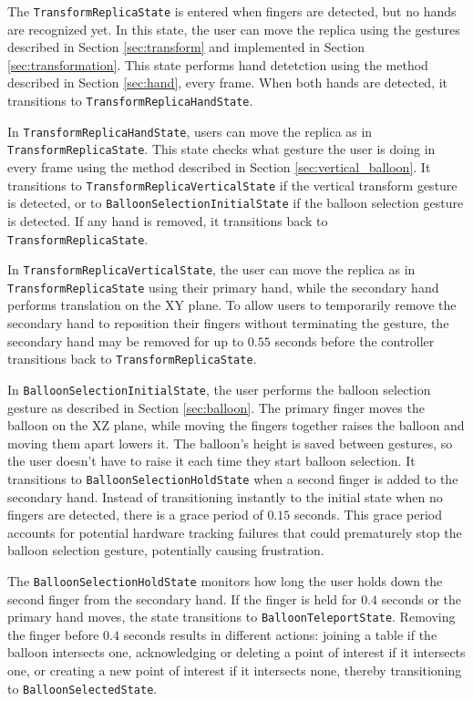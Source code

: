     The \lstinline{TransformReplicaState} is entered when fingers are detected, but no hands are recognized yet. In this state, the user can move the replica using the gestures described in Section \ref{sec:transform} and implemented in Section \ref{sec:transformation}. This state performs hand detetction using the method described in Section \ref{sec:hand}, every frame. When both hands are detected, it transitions to \lstinline{TransformReplicaHandState}.
    
    In \lstinline{TransformReplicaHandState}, users can move the replica as in \lstinline{TransformReplicaState}. This state checks what gesture the user is doing in every frame using the method described in Section \ref{sec:vertical_balloon}. It transitions to \lstinline{TransformReplicaVerticalState} if the vertical transform gesture is detected, or to \lstinline{BalloonSelectionInitialState} if the balloon selection gesture is detected. If any hand is removed, it transitions back to \lstinline{TransformReplicaState}.

    In \lstinline{TransformReplicaVerticalState}, the user can move the replica as in \lstinline{TransformReplicaState} using their primary hand, while the secondary hand performs translation on the XY plane. To allow users to temporarily remove the secondary hand to reposition their fingers without terminating the gesture, the secondary hand may be removed for up to $0.55$ seconds before the controller transitions back to \lstinline{TransformReplicaState}.

    In \lstinline{BalloonSelectionInitialState}, the user performs the balloon selection gesture as described in Section \ref{sec:balloon}. The primary finger moves the balloon on the XZ plane, while moving the fingers together raises the balloon and moving them apart lowers it. The balloon's height is saved between gestures, so the user doesn't have to raise it each time they start balloon selection. It transitions to \lstinline{BalloonSelectionHoldState} when a second finger is added to the secondary hand. Instead of transitioning instantly to the initial state when no fingers are detected, there is a grace period of $0.15$ seconds. This grace period accounts for potential hardware tracking failures that could prematurely stop the balloon selection gesture, potentially causing frustration.

    The \lstinline{BalloonSelectionHoldState} monitors how long the user holds down the second finger from the secondary hand. If the finger is held for $0.4$ seconds or the primary hand moves, the state transitions to \lstinline{BalloonTeleportState}. Removing the finger before $0.4$ seconds results in different actions: joining a table if the balloon intersects one, acknowledging or deleting a point of interest if it intersects one, or creating a new point of interest if it intersects none, thereby transitioning to \lstinline{BalloonSelectedState}.

